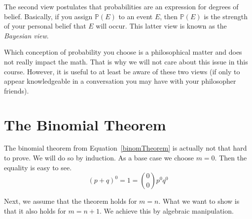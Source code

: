 The second view postulates that probabilities are an expression for degrees of belief. Basically, 
if you assign $ \mathbb{P}(E) $ to an event $ E $, then $ \mathbb{P}(E) $ is the strength of your personal belief that
$ E $ will occur. This latter view is known as the \emph{Bayesian view}.

Which conception of probability you choose is a philosophical matter and does not really impact the math.
That is why we will not care about this issue in this course. However, it is useful to at least be aware
of these two views (if only to appear knowledgeable in a conversation you may have with your philosopher 
friends).


\section{The Binomial Theorem}
The binomial theorem from Equation~\ref{binomTheorem} is actually not that hard to prove. We will do so by
induction. As a base case we choose $ m = 0 $. Then the equality is easy to see.
\begin{equation}
(p + q)^{0} = 1 = \binom{0}{0}p^{0}q^{0}
\end{equation}

Next, we assume that the theorem holds for $ m = n $. What we want to show is that it also holds for
$ m = n + 1 $. We achieve this by algebraic manipulation.

